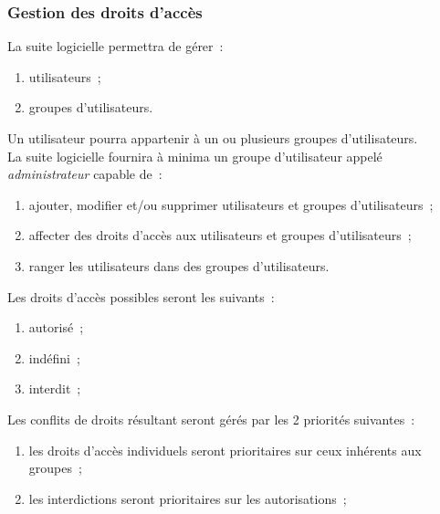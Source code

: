 \subsubsection{Gestion des droits d'accès}
La suite logicielle permettra de gérer~:
\begin{enumerate}
	\item utilisateurs~;
	\item groupes d'utilisateurs.
\end{enumerate}
Un utilisateur pourra appartenir à un ou plusieurs groupes d'utilisateurs.
\\
La suite logicielle fournira à minima un groupe d'utilisateur appelé \emph{administrateur} capable de~:
\begin{enumerate}
	\item ajouter, modifier et/ou supprimer utilisateurs et groupes d'utilisateurs~;
	\item affecter des droits d'accès aux utilisateurs et groupes d'utilisateurs~;
	\item ranger les utilisateurs dans des groupes d'utilisateurs.
\end{enumerate}
Les droits d'accès possibles seront les suivants~:
\begin{enumerate}
	\item autorisé~;
	\item indéfini~;
	\item interdit~;
\end{enumerate}
Les conflits de droits résultant seront gérés par les 2 priorités suivantes~:
\begin{enumerate}
	\item les droits d'accès individuels seront prioritaires sur ceux inhérents aux groupes~;
	\item les interdictions seront prioritaires sur les autorisations~;
\end{enumerate}

